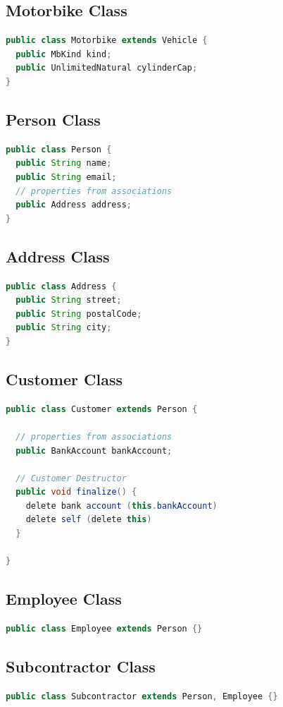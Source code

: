 \documentclass[12pt]{article}
\begin{document}
\subsection*{Motorbike Class}
\begin{lstlisting}[language=Java]
public class Motorbike extends Vehicle {
  public MbKind kind;
  public UnlimitedNatural cylinderCap;
}
\end{lstlisting}
\subsection*{Person Class}
\begin{lstlisting}[language=Java]
public class Person {
  public String name;
  public String email;
  // properties from associations
  public Address address;
}
\end{lstlisting}
\subsection*{Address Class}
\begin{lstlisting}[language=Java]
public class Address {
  public String street;
  public String postalCode;
  public String city;
}
\end{lstlisting}
\subsection*{Customer Class}
\begin{lstlisting}[language=Java]
public class Customer extends Person {
  
  // properties from associations
  public BankAccount bankAccount;

  // Customer Destructor
  public void finalize() {
    delete bank account (this.bankAccount)
    delete self (delete this)
  }

}
\end{lstlisting}
\subsection*{Employee Class}
\begin{lstlisting}[language=Java]
public class Employee extends Person {}
\end{lstlisting}
\subsection*{Subcontractor Class}
\begin{lstlisting}[language=Java]
public class Subcontractor extends Person, Employee {}
\end{lstlisting}
\end{document}
